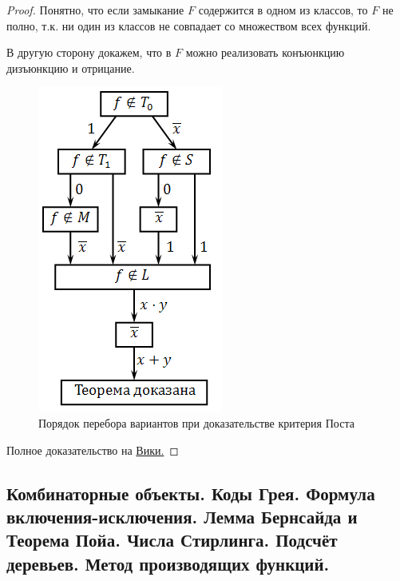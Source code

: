\documentclass{article}
\begin{document}
\begin{proof}
	Понятно, что если замыкание $F$ содержится в одном из классов, то $F$ не полно, т.к. ни один из классов не совпадает со множеством всех функций.
	
	В другую сторону докажем, что в $F$ можно реализовать конъюнкцию дизъюнкцию и отрицание. 
	
	\begin{figure}[H]
		\centering
		\includegraphics[scale=0.4]{images/post_sheme.png}
		\caption{Порядок перебора вариантов при доказательстве критерия Поста}
	\end{figure}
	
	Полное доказательство на \href{https://ru.wikipedia.org/wiki/%D0%9A%D1%80%D0%B8%D1%82%D0%B5%D1%80%D0%B8%D0%B9_%D0%9F%D0%BE%D1%81%D1%82%D0%B0}{Вики.}
\end{proof}


\subsection{Комбинаторные объекты. Коды Грея. Формула включения-исключения. Лемма Бернсайда и Теорема Пойа. Числа Стирлинга. Подсчёт деревьев. Метод производящих функций.}
\end{document}
